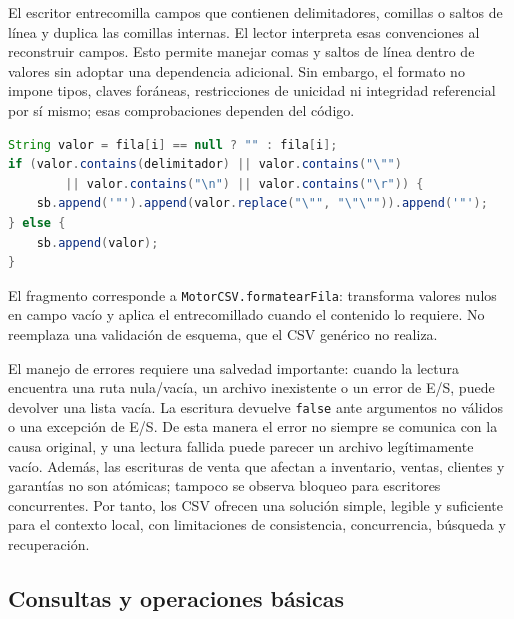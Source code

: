 El escritor entrecomilla campos que contienen delimitadores, comillas o saltos de línea y duplica las comillas internas. El lector interpreta esas convenciones al reconstruir campos. Esto permite manejar comas y saltos de línea dentro de valores sin adoptar una dependencia adicional. Sin embargo, el formato no impone tipos, claves foráneas, restricciones de unicidad ni integridad referencial por sí mismo; esas comprobaciones dependen del código.

\begin{lstlisting}[language=Java,caption={Fragmento real del formateo de una celda CSV.},label={lst:formateo-csv}]
String valor = fila[i] == null ? "" : fila[i];
if (valor.contains(delimitador) || valor.contains("\"")
        || valor.contains("\n") || valor.contains("\r")) {
    sb.append('"').append(valor.replace("\"", "\"\"")).append('"');
} else {
    sb.append(valor);
}
\end{lstlisting}

El fragmento corresponde a \texttt{MotorCSV.formatearFila}: transforma valores nulos en campo vacío y aplica el entrecomillado cuando el contenido lo requiere. No reemplaza una validación de esquema, que el CSV genérico no realiza.

El manejo de errores requiere una salvedad importante: cuando la lectura encuentra una ruta nula/vacía, un archivo inexistente o un error de E/S, puede devolver una lista vacía. La escritura devuelve \texttt{false} ante argumentos no válidos o una excepción de E/S. De esta manera el error no siempre se comunica con la causa original, y una lectura fallida puede parecer un archivo legítimamente vacío. Además, las escrituras de venta que afectan a inventario, ventas, clientes y garantías no son atómicas; tampoco se observa bloqueo para escritores concurrentes. Por tanto, los CSV ofrecen una solución simple, legible y suficiente para el contexto local, con limitaciones de consistencia, concurrencia, búsqueda y recuperación.

\subsection{Consultas y operaciones básicas}
\label{subsec:operaciones}

